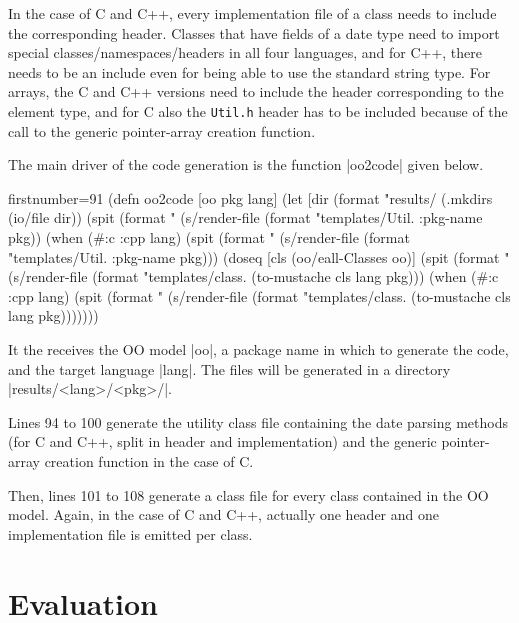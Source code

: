 \documentclass[a4paper]{article}
\newcommand{\code}{\clojureinline}
\begin{document}
In the case of C and C++, every implementation file of a class needs to include
the corresponding header.  Classes that have fields of a date type need to
import special classes/namespaces/headers in all four languages, and for C++,
there needs to be an include even for being able to use the standard string
type.  For arrays, the C and C++ versions need to include the header
corresponding to the element type, and for C also the \texttt{Util.h} header
has to be included because of the call to the generic pointer-array creation
function.

The main driver of the code generation is the function \code|oo2code| given
below.

\begin{clojurecode*}{firstnumber=91}
(defn oo2code [oo pkg lang]
  (let [dir (format "results/%
    (.mkdirs (io/file dir))
    (spit (format "%
          (s/render-file (format "templates/Util.%
                         {:pkg-name pkg}))
    (when (#{:c :cpp} lang)
      (spit (format "%
            (s/render-file (format "templates/Util.%
                           {:pkg-name pkg})))
    (doseq [cls (oo/eall-Classes oo)]
      (spit (format "%
            (s/render-file (format "templates/class.%
                           (to-mustache cls lang pkg)))
      (when (#{:c :cpp} lang)
        (spit (format "%
              (s/render-file (format "templates/class.%
                             (to-mustache cls lang pkg)))))))
\end{clojurecode*}

It the receives the OO model \code|oo|, a package name in which to generate the
code, and the target language \code|lang|.  The files will be generated in a
directory \code|results/<lang>/<pkg>/|.

Lines 94 to 100 generate the utility class file containing the date parsing
methods (for C and C++, split in header and implementation) and the generic
pointer-array creation function in the case of C.

Then, lines 101 to 108 generate a class file for every class contained in the
OO model.  Again, in the case of C and C++, actually one header and one
implementation file is emitted per class.

\section{Evaluation}
\label{sec:evaluation}
\end{document}
